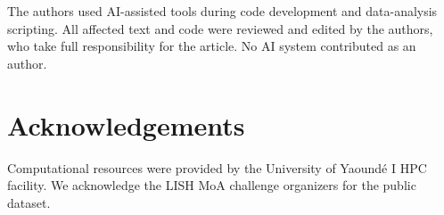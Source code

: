 \documentclass[11pt,a4paper]{article}
\begin{document}
The authors used AI-assisted tools during code development and data-analysis scripting. All affected text and code were reviewed and edited by the authors, who take full responsibility for the article. No AI system contributed as an author.

\section*{Acknowledgements}

Computational resources were provided by the University of Yaound\'e I HPC facility. We acknowledge the LISH MoA challenge organizers for the public dataset.



\end{document}
